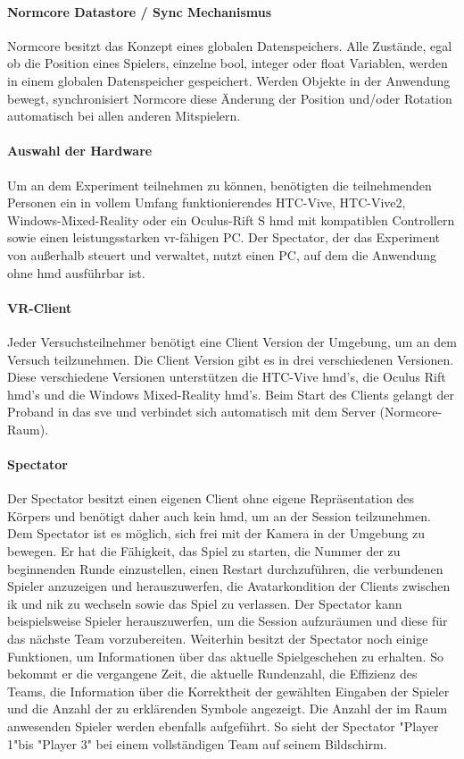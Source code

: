 \documentclass[a4paper,11pt]{article}%
\renewcommand{\\}{\vspace*{0.5\baselineskip} \newline}
\begin{document}
\paragraph{Normcore Datastore / Sync Mechanismus}
Normcore besitzt das Konzept eines globalen Datenspeichers.  Alle Zustände, egal ob die Position eines Spielers, einzelne bool, integer oder float Variablen, werden in einem globalen Datenspeicher gespeichert. Werden Objekte in der Anwendung bewegt, synchronisiert Normcore diese Änderung der Position und/oder Rotation automatisch bei allen anderen Mitspielern.

\paragraph{Auswahl der Hardware}
Um an dem Experiment teilnehmen zu können, benötigten die teilnehmenden Personen ein in vollem Umfang funktionierendes HTC-Vive, HTC-Vive2, Windows-Mixed-Reality oder ein Oculus-Rift S \ac{hmd} mit kompatiblen Controllern sowie einen leistungsstarken \ac{vr}-fähigen PC. Der Spectator, der das Experiment von außerhalb steuert und verwaltet, nutzt einen PC, auf dem die Anwendung ohne \ac{hmd} ausführbar ist.

\paragraph{VR-Client}
Jeder Versuchsteilnehmer benötigt eine Client Version der Umgebung, um an dem Versuch teilzunehmen. Die Client Version gibt es in drei verschiedenen Versionen. Diese verschiedene Versionen unterstützen die HTC-Vive \ac{hmd}'s, die Oculus Rift \ac{hmd}'s und die Windows Mixed-Reality \ac{hmd}'s. Beim Start des Clients gelangt der Proband in das \ac{sve} und verbindet sich automatisch mit dem Server (Normcore-Raum).

\paragraph{Spectator}
Der Spectator besitzt einen eigenen Client ohne eigene Repräsentation des Körpers und benötigt daher auch kein \ac{hmd}, um an der Session teilzunehmen. Dem Spectator ist es möglich, sich frei mit der Kamera in der Umgebung zu bewegen.
Er hat die Fähigkeit, das Spiel zu starten, die Nummer der zu beginnenden Runde einzustellen, einen Restart durchzuführen, die verbundenen Spieler anzuzeigen und herauszuwerfen, die Avatarkondition der Clients zwischen \ac{ik} und \ac{nik} zu wechseln sowie das Spiel zu verlassen.
Der Spectator kann beispielsweise Spieler herauszuwerfen, um die Session aufzuräumen und diese für das nächste Team vorzubereiten. Weiterhin besitzt der Spectator noch einige Funktionen, um Informationen über das aktuelle Spielgeschehen zu erhalten. So bekommt er die vergangene Zeit, die aktuelle Rundenzahl, die Effizienz des Teams, die Information über die Korrektheit der gewählten Eingaben der Spieler und die Anzahl der zu erklärenden Symbole angezeigt. Die Anzahl der im Raum anwesenden Spieler werden ebenfalls aufgeführt. So sieht der Spectator "Player 1"bis "Player 3" bei einem vollständigen Team auf seinem Bildschirm. 
\end{document}

